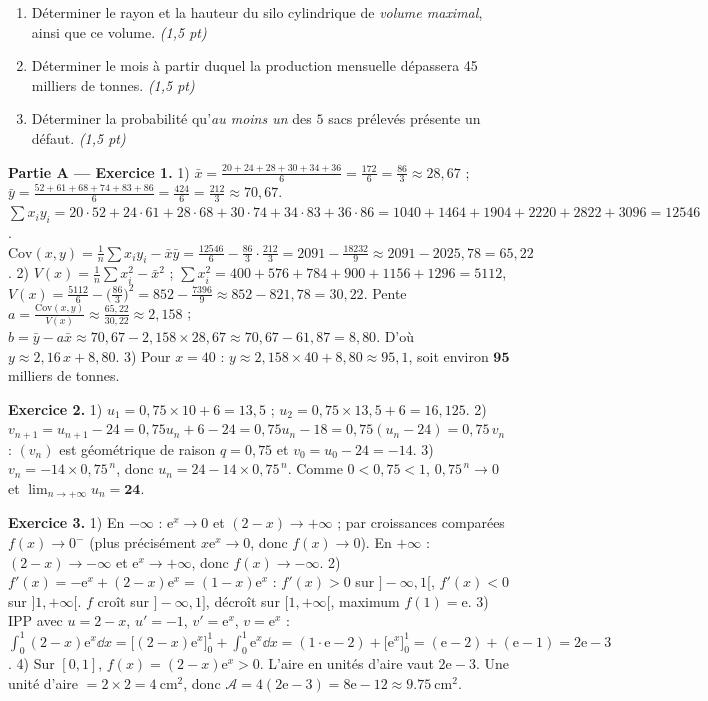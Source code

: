 \begin{enumerate}[label=\textbf{Tâche \arabic*.},leftmargin=2.4em]
\item Déterminer le rayon et la hauteur du silo cylindrique de \emph{volume maximal}, ainsi que ce volume. \hfill\textit{(1,5 pt)}
\item Déterminer le mois à partir duquel la production mensuelle dépassera \SI{45}{} milliers de tonnes. \hfill\textit{(1,5 pt)}
\item Déterminer la probabilité qu'\emph{au moins un} des $5$ sacs prélevés présente un défaut. \hfill\textit{(1,5 pt)}
\end{enumerate}
\par{}


\noindent\textbf{Partie A — Exercice 1.}
1) $\bar x=\frac{20+24+28+30+34+36}{6}=\frac{172}{6}=\frac{86}{3}\approx28{,}67$ ;
$\bar y=\frac{52+61+68+74+83+86}{6}=\frac{424}{6}=\frac{212}{3}\approx70{,}67$.
$\sum x_iy_i=20\cdot52+24\cdot61+28\cdot68+30\cdot74+34\cdot83+36\cdot86=1040+1464+1904+2220+2822+3096=12546$.
$\mathrm{Cov}(x,y)=\frac1n\sum x_iy_i-\bar x\bar y=\frac{12546}{6}-\frac{86}{3}\cdot\frac{212}{3}=2091-\frac{18232}{9}\approx2091-2025{,}78=65{,}22$.
2) $V(x)=\frac1n\sum x_i^2-\bar x^2$ ; $\sum x_i^2=400+576+784+900+1156+1296=5112$,
$V(x)=\frac{5112}{6}-\big(\frac{86}{3}\big)^2=852-\frac{7396}{9}\approx852-821{,}78=30{,}22$.
Pente $a=\frac{\mathrm{Cov}(x,y)}{V(x)}\approx\frac{65{,}22}{30{,}22}\approx2{,}158$ ;
$b=\bar y-a\bar x\approx70{,}67-2{,}158\times28{,}67\approx70{,}67-61{,}87=8{,}80$. D'où $y\approx2{,}16\,x+8{,}80$.
3) Pour $x=40$ : $y\approx2{,}158\times40+8{,}80\approx95{,}1$, soit environ $\mathbf{95}$ milliers de tonnes.

\noindent\textbf{Exercice 2.}
1) $u_1=0{,}75\times10+6=13{,}5$ ; $u_2=0{,}75\times13{,}5+6=16{,}125$.
2) $v_{n+1}=u_{n+1}-24=0{,}75u_n+6-24=0{,}75u_n-18=0{,}75(u_n-24)=0{,}75\,v_n$ :
$(v_n)$ est géométrique de raison $q=0{,}75$ et $v_0=u_0-24=-14$.
3) $v_n=-14\times0{,}75^{\,n}$, donc $u_n=24-14\times0{,}75^{\,n}$. Comme $0<0{,}75<1$, $0{,}75^{\,n}\to0$
et $\displaystyle\lim_{n\to+\infty}u_n=\mathbf{24}$.

\noindent\textbf{Exercice 3.}
1) En $-\infty$ : $\mathrm{e}^x\to0$ et $(2-x)\to+\infty$ ; par croissances comparées $f(x)\to0^-$
(plus précisément $x\mathrm{e}^x\to0$, donc $f(x)\to0$). En $+\infty$ : $(2-x)\to-\infty$ et $\mathrm{e}^x\to+\infty$, donc $f(x)\to-\infty$.
2) $f'(x)=-\mathrm{e}^x+(2-x)\mathrm{e}^x=(1-x)\mathrm{e}^x$ : $f'(x)>0$ sur $]-\infty,1[$, $f'(x)<0$ sur $]1,+\infty[$.
$f$ croît sur $]-\infty,1]$, décroît sur $[1,+\infty[$, maximum $f(1)=\mathrm{e}$.
3) IPP avec $u=2-x$, $u'=-1$, $v'=\mathrm{e}^x$, $v=\mathrm{e}^x$ :
$\int_0^1(2-x)\mathrm{e}^x\dd x=\big[(2-x)\mathrm{e}^x\big]_0^1+\int_0^1\mathrm{e}^x\dd x=(1\cdot\mathrm{e}-2)+\big[\mathrm{e}^x\big]_0^1=(\mathrm{e}-2)+(\mathrm{e}-1)=2\mathrm{e}-3$.
4) Sur $[0,1]$, $f(x)=(2-x)\mathrm{e}^x>0$. L'aire en unités d'aire vaut $2\mathrm{e}-3$.
Une unité d'aire $=2\times2=\SI{4}{\centi\metre\squared}$, donc $\mathcal A=4(2\mathrm{e}-3)=8\mathrm{e}-12\approx\SI{9,75}{\centi\metre\squared}$.

